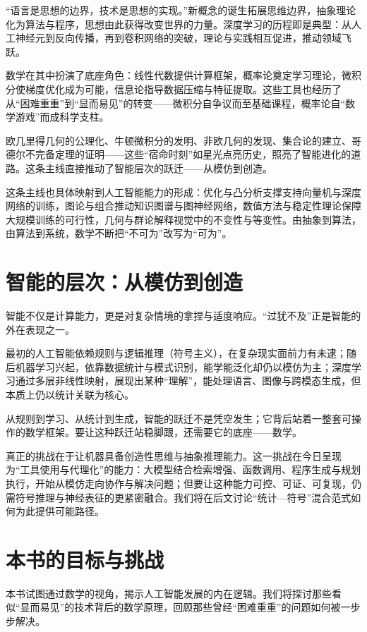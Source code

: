 “语言是思想的边界，技术是思想的实现。”新概念的诞生拓展思维边界，抽象理论化为算法与程序，思想由此获得改变世界的力量。深度学习的历程即是典型：从人工神经元到反向传播，再到卷积网络的突破，理论与实践相互促进，推动领域飞跃。

数学在其中扮演了底座角色：线性代数提供计算框架，概率论奠定学习理论，微积分使梯度优化成为可能，信息论指导数据压缩与特征提取。这些工具也经历了从“困难重重”到“显而易见”的转变——微积分自争议而至基础课程，概率论自“数学游戏”而成科学支柱。

欧几里得几何的公理化、牛顿微积分的发明、非欧几何的发现、集合论的建立、哥德尔不完备定理的证明——这些“宿命时刻”如星光点亮历史，照亮了智能进化的道路。这条主线直接推动了智能层次的跃迁——从模仿到创造。

这条主线也具体映射到人工智能能力的形成：优化与凸分析支撑支持向量机与深度网络的训练，图论与组合推动知识图谱与图神经网络，数值方法与稳定性理论保障大规模训练的可行性，几何与群论解释视觉中的不变性与等变性。由抽象到算法，由算法到系统，数学不断把“不可为”改写为“可为”。

\section{智能的层次：从模仿到创造}

智能不仅是计算能力，更是对复杂情境的拿捏与适度响应。“过犹不及”正是智能的外在表现之一。

最初的人工智能依赖规则与逻辑推理（符号主义），在复杂现实面前力有未逮；随后机器学习兴起，依靠数据统计与模式识别，能学能泛化却仍以模仿为主；深度学习通过多层非线性映射，展现出某种“理解”，能处理语言、图像与跨模态生成，但本质上仍以统计关联为核心。

从规则到学习、从统计到生成，智能的跃迁不是凭空发生；它背后站着一整套可操作的数学框架。要让这种跃迁站稳脚跟，还需要它的底座——数学。

真正的挑战在于让机器具备创造性思维与抽象推理能力。这一挑战在今日呈现为“工具使用与代理化”的能力：大模型结合检索增强、函数调用、程序生成与规划执行，开始从模仿走向协作与解决问题；但要让这种能力可控、可证、可复现，仍需符号推理与神经表征的更紧密融合。我们将在后文讨论“统计—符号”混合范式如何为此提供可能路径。

\section{本书的目标与挑战}

本书试图通过数学的视角，揭示人工智能发展的内在逻辑。我们将探讨那些看似“显而易见”的技术背后的数学原理，回顾那些曾经“困难重重”的问题如何被一步步解决。

